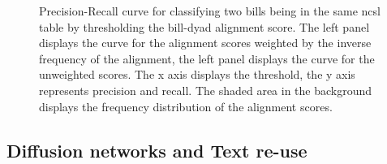 \documentclass[12pt]{article} %
\begin{document}
\begin{figure}
\centering     %
{}
\caption{Precision-Recall curve for classifying two bills being in the same
    ncsl table by thresholding the bill-dyad alignment score. The left panel displays the curve for the alignment scores weighted by the inverse frequency of the alignment, the left panel displays the curve for the unweighted scores. The x axis
displays the threshold, the y axis represents precision and recall. The shaded
area in the background displays the frequency distribution of the alignment
scores.}
\label{fig:ncsl_prec_rec}
\end{figure}


\subsection{Diffusion networks and Text re-use}
\end{document}
